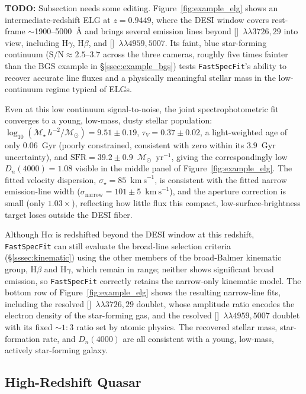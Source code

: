 \documentclass[modern,linenumbers]{aastex701}
\newcommand{\todo}[1]{{\color{red}\textbf{TODO:} #1}}
\newcommand{\fastspecfit}{\texttt{FastSpecFit}}
\newcommand{\kms}{\ensuremath{\mathrm{km~s}^{-1}}}
\newcommand{\ha}{H\ensuremath{\alpha}}
\newcommand{\hb}{H\ensuremath{\beta}}
\newcommand{\oiidoublet}{[\ion{O}{2}]~$\lambda\lambda3726,29$}
\newcommand{\oiiidoublet}{[\ion{O}{3}]~$\lambda\lambda4959,5007$}
\newcommand{\vdisp}{\ensuremath{\sigma_\star}}
\newcommand{\tauv}{\ensuremath{\tau_V}}
\newcommand{\Mstar}{\ensuremath{\mathcal{M}_{\star}}}
\newcommand{\msun}{\ensuremath{\mathcal{M}_{\odot}}}
\newcommand{\logmstar}{\ensuremath{\log_{10}(\Mstar\,h^{-2}/\msun)}}
\begin{document}
\todo{Subsection needs some editing.} Figure~\ref{fig:example_elg}
shows an intermediate-redshift ELG at $z=0.9449$, where the DESI
window covers rest-frame $\sim$1900--5000~\AA{} and brings several
emission lines beyond \oiidoublet{} into view, including H$\gamma$,
\hb{}, and \oiiidoublet{}.  Its faint, blue star-forming continuum
($\mathrm{S/N}\approx2.5$--$3.7$ across the three cameras, roughly
five times fainter than the BGS example in \S\ref{ssec:example_bgs})
tests \fastspecfit{}'s ability to recover accurate line fluxes and a
physically meaningful stellar mass in the low-continuum regime typical
of ELGs.

Even at this low continuum signal-to-noise, the joint spectrophotometric
fit converges to a young, low-mass, dusty stellar population:
$\logmstar=9.51\pm0.19$, $\tauv=0.37\pm0.02$, a light-weighted age of
only $0.06$~Gyr (poorly constrained, consistent with zero within its
$3.9$~Gyr uncertainty), and $\mathrm{SFR}=39.2\pm0.9$~\msun{}~yr$^{-1}$,
giving the correspondingly low $D_n(4000)=1.08$ visible in the middle
panel of Figure~\ref{fig:example_elg}. The fitted velocity dispersion,
$\vdisp=85$~\kms{}, is consistent with the fitted narrow emission-line
width ($\sigma_\mathrm{narrow}=101\pm5$~\kms{}), and the aperture
correction is small (only $1.03\times$), reflecting how little flux
this compact, low-surface-brightness target loses outside the DESI
fiber.

Although \ha{} is redshifted beyond the DESI window at this redshift,
\fastspecfit{} can still evaluate the broad-line selection criteria
(\S\ref{sssec:kinematic}) using the other members of the broad-Balmer
kinematic group, \hb{} and H$\gamma$, which remain in range; neither
shows significant broad emission, so \fastspecfit{} correctly retains
the narrow-only kinematic model. The bottom row of
Figure~\ref{fig:example_elg} shows
the resulting narrow-line fits, including the resolved \oiidoublet{}
doublet, whose amplitude ratio encodes the electron density of the
star-forming gas, and the resolved \oiiidoublet{} doublet with its
fixed $\sim1{:}3$ ratio set by atomic physics. The recovered stellar
mass, star-formation rate, and $D_n(4000)$ are all consistent with a
young, low-mass, actively star-forming galaxy.

\subsection{High-Redshift Quasar}
\label{ssec:example_qso}
\end{document}

